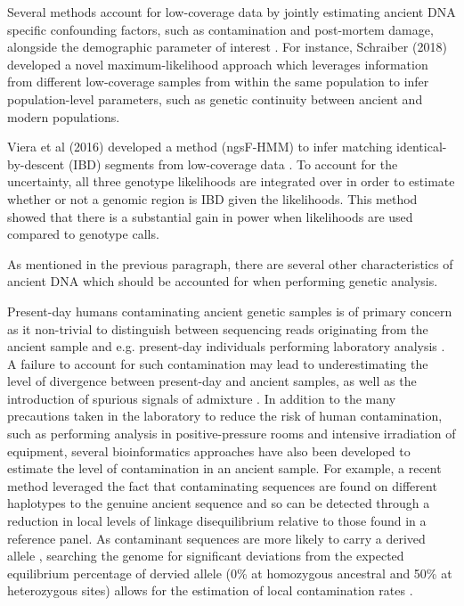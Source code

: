 Several methods account for low-coverage data by jointly estimating ancient DNA specific confounding factors, such as contamination and  post-mortem damage, alongside the demographic parameter of interest \cite{Racimo2016}. For instance, Schraiber (2018) \cite{Schraiber2018} developed a novel maximum-likelihood approach which leverages information from different low-coverage samples from within the same population to infer population-level parameters, such as genetic continuity between ancient and modern populations.  

Viera et al (2016) developed a method (ngsF-HMM) to infer matching identical-by-descent (IBD) segments from low-coverage data \cite{Vieira2016}. To account for the uncertainty, all three genotype likelihoods are integrated over in order to estimate whether or not a genomic region is IBD given the likelihoods. This method showed that there is a substantial gain in power when likelihoods are used compared to genotype calls.  

As mentioned in the previous paragraph, there are several other characteristics of ancient DNA which should be accounted for when performing genetic analysis. 

Present-day humans contaminating ancient genetic samples is of primary concern as it non-trivial to distinguish between sequencing reads originating from the ancient sample and e.g. present-day individuals performing laboratory analysis \cite{peyregne2020present}. A failure to account for such contamination may lead to underestimating the level of divergence between present-day and ancient samples, as well as the introduction of spurious signals of admixture \cite{Green2010, wall2007inconsistencies, green2009neandertal}. In addition to the many precautions taken in the laboratory to reduce the risk of human contamination, such as performing analysis in positive-pressure rooms and intensive irradiation of equipment, several bioinformatics approaches have also been developed to estimate the level of contamination in an ancient sample. For example, a recent method leveraged the fact that contaminating sequences are found on different haplotypes to the genuine ancient sequence and so can be detected through a reduction in local levels of linkage disequilibrium relative to those found in a reference panel\cite{nakatsuka2020contamld}. As contaminant sequences are more likely to carry a derived allele \cite{peyregne2020present}, searching the genome for significant deviations from the expected equilibrium percentage of dervied allele (0\% at homozygous ancestral and 50\% at heterozygous sites) allows for the estimation of local contamination rates \cite{Green2010, Meyer2012}. 

